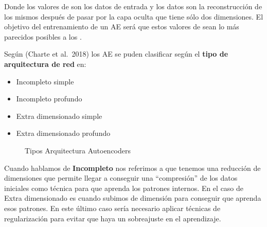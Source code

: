 \documentclass[
  a4paper,
  DIV=11,
  numbers=noendperiod]{scrreprt}
\begin{document}
Donde los valores de son los datos de entrada y los datos son la
reconstrucción de los mismos después de pasar por la capa oculta que
tiene sólo dos dimensiones. El objetivo del entrenamiento de un AE será
que estos valores de sean lo más parecidos posibles a los .

Según (Charte et al.~2018) los AE se puden clasificar según el
\textbf{tipo de arquitectura de red} en:

\begin{itemize}
\item
  Incompleto simple
\item
  Incompleto profundo
\item
  Extra dimensionado simple
\item
  Extra dimensionado profundo
\end{itemize}

\begin{figure}


\caption{\label{fig-tipos_autoencoders}Tipos Arquitectura Autoencoders}

\end{figure}%

Cuando hablamos de \textbf{Incompleto} nos referimos a que tenemos una
reducción de dimensiones que permite llegar a conseguir una
``compresión'' de los datos iniciales como técnica para que aprenda los
patrones internos. En el caso de Extra dimensionado es cuando subimos de
dimensión para conseguir que aprenda esos patrones. En este último caso
sería necesario aplicar técnicas de regularización para evitar que haya
un sobreajuste en el aprendizaje.
\end{document}
